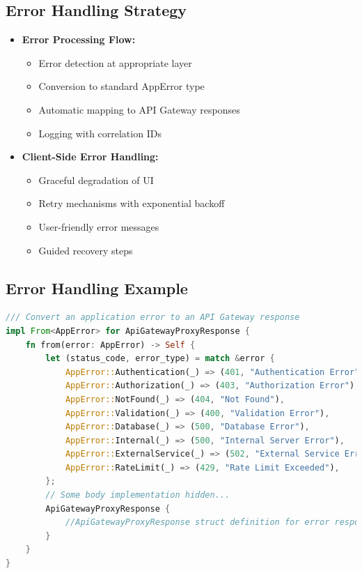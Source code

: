 \documentclass[a4paper, 11pt]{scrreprt}
\begin{document}
\subsection{Error Handling Strategy}
\begin{itemize}
    \item \textbf{Error Processing Flow:}
    \begin{itemize}
        \item Error detection at appropriate layer
        \item Conversion to standard AppError type
        \item Automatic mapping to API Gateway responses
        \item Logging with correlation IDs
    \end{itemize}
    
    \item \textbf{Client-Side Error Handling:}
    \begin{itemize}
        \item Graceful degradation of UI
        \item Retry mechanisms with exponential backoff
        \item User-friendly error messages
        \item Guided recovery steps
    \end{itemize}
\end{itemize}

\subsection{Error Handling Example}
\begin{lstlisting}[language=Rust]
/// Convert an application error to an API Gateway response
impl From<AppError> for ApiGatewayProxyResponse {
    fn from(error: AppError) -> Self {
        let (status_code, error_type) = match &error {
            AppError::Authentication(_) => (401, "Authentication Error"),
            AppError::Authorization(_) => (403, "Authorization Error"),
            AppError::NotFound(_) => (404, "Not Found"),
            AppError::Validation(_) => (400, "Validation Error"),
            AppError::Database(_) => (500, "Database Error"),
            AppError::Internal(_) => (500, "Internal Server Error"),
            AppError::ExternalService(_) => (502, "External Service Error"),
            AppError::RateLimit(_) => (429, "Rate Limit Exceeded"),
        };
        // Some body implementation hidden...
        ApiGatewayProxyResponse { 
            //ApiGatewayProxyResponse struct definition for error response
        }
    }
} 
\end{lstlisting}
\end{document}
